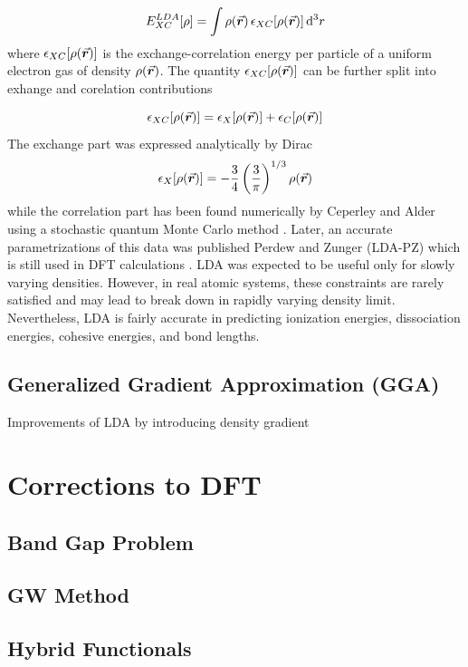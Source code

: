 \begin{equation}
    E^{LDA}_{XC} [\rho]= \int \rho({\va*{r}}) \,\epsilon_{XC}[\rho({\va*{r}}) ] \dd[3]{r}
\end{equation}
where $\epsilon_{XC}[\rho({\va*{r}}) ]$ is the exchange-correlation energy per particle of a uniform electron gas of density $\rho({\va*{r}})$. The quantity $\epsilon_{XC}[\rho({\va*{r}}) ]$ can be further split into exhange and corelation contributions 

\begin{equation}
    \epsilon_{XC}[\rho({\va*{r}}) ] = \epsilon_{X}[\rho({\va*{r}}) ] + \epsilon_{C}[\rho({\va*{r}})]
\end{equation}
The exchange part was expressed analytically by Dirac \citep{Dirac1930}
\begin{equation}
    \epsilon_{X}[\rho({\va*{r}}) ] = - \frac{3}{4} \left( \frac{3}{\pi} \right)^{1/3} \rho({\va*{r}}) 
\end{equation}
while the correlation part has been found  numerically by Ceperley and Alder \citep{Ceperley1980} using a stochastic quantum Monte Carlo method \citep{Foulkes2001}. Later, an accurate parametrizations of this data was published Perdew and Zunger (LDA-PZ) which is still used in DFT calculations \citep{Perdew1981}. LDA was expected to be useful only for slowly varying densities. However, in real atomic systems, these constraints are rarely satisfied and may lead to break down in rapidly varying density limit. Nevertheless, LDA is fairly accurate in predicting ionization energies, dissociation energies, cohesive energies, and bond lengths. 
    \subsection{Generalized Gradient Approximation (GGA)}
    Improvements of LDA by introducing density gradient 
\section{Corrections to DFT}
    \subsection{Band Gap Problem}
    \subsection{GW Method}
    \subsection{Hybrid Functionals}
